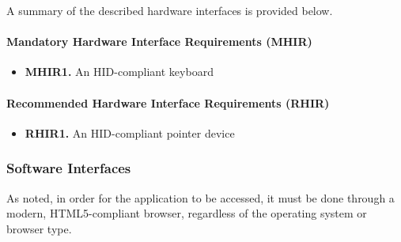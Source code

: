 
A summary of the described hardware interfaces is provided below.

\paragraph{Mandatory Hardware Interface Requirements (MHIR)}
\begin{itemize}
    \item \textbf{MHIR1.} An HID-compliant keyboard
\end{itemize}

\paragraph{Recommended Hardware Interface Requirements (RHIR)}
\begin{itemize}
    \item \textbf{RHIR1.} An HID-compliant pointer device
\end{itemize}



\subsubsection{Software Interfaces}

As noted, in order for the application to be accessed, it must be done through a modern, HTML5-compliant browser, regardless of the operating system or browser type. 

